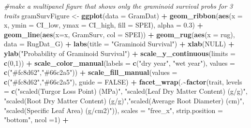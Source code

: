 \documentclass[
]{article}
\newenvironment{Shaded}{\begin{snugshade}}{\end{snugshade}}
\newcommand{\CommentTok}[1]{\textcolor[rgb]{0.56,0.35,0.01}{\textit{#1}}}
\newcommand{\DataTypeTok}[1]{\textcolor[rgb]{0.13,0.29,0.53}{#1}}
\newcommand{\DecValTok}[1]{\textcolor[rgb]{0.00,0.00,0.81}{#1}}
\newcommand{\FloatTok}[1]{\textcolor[rgb]{0.00,0.00,0.81}{#1}}
\newcommand{\KeywordTok}[1]{\textcolor[rgb]{0.13,0.29,0.53}{\textbf{#1}}}
\newcommand{\NormalTok}[1]{#1}
\newcommand{\OperatorTok}[1]{\textcolor[rgb]{0.81,0.36,0.00}{\textbf{#1}}}
\newcommand{\OtherTok}[1]{\textcolor[rgb]{0.56,0.35,0.01}{#1}}
\newcommand{\StringTok}[1]{\textcolor[rgb]{0.31,0.60,0.02}{#1}}
\begin{document}
\begin{Shaded}
\begin{Highlighting}[]
\CommentTok{\#make a multipanel figure that shows only the graminoid survival probs for 3 traits}
\NormalTok{gramSurvFigure \textless{}{-}}\StringTok{ }\KeywordTok{ggplot}\NormalTok{(}\DataTypeTok{data =}\NormalTok{ GramDat) }\OperatorTok{+}
\StringTok{  }\KeywordTok{geom\_ribbon}\NormalTok{(}\KeywordTok{aes}\NormalTok{(}\DataTypeTok{x =}\NormalTok{ x, }\DataTypeTok{ymin =}\NormalTok{ CI\_low, }\DataTypeTok{ymax =}\NormalTok{ CI\_high, }\DataTypeTok{fill =}\NormalTok{ SPEI), }\DataTypeTok{alpha =} \FloatTok{0.3}\NormalTok{) }\OperatorTok{+}
\StringTok{  }\KeywordTok{geom\_line}\NormalTok{(}\KeywordTok{aes}\NormalTok{(}\DataTypeTok{x=}\NormalTok{x, GramSurv, }\DataTypeTok{col =}\NormalTok{ SPEI))  }\OperatorTok{+}\StringTok{ }
\StringTok{  }\KeywordTok{geom\_rug}\NormalTok{(}\KeywordTok{aes}\NormalTok{(}\DataTypeTok{x =}\NormalTok{ rug), }\DataTypeTok{data =}\NormalTok{ RugDat\_G) }\OperatorTok{+}
\StringTok{  }\KeywordTok{labs}\NormalTok{(}\DataTypeTok{title =} \StringTok{"Graminoid Survival"}\NormalTok{) }\OperatorTok{+}
\StringTok{  }\KeywordTok{xlab}\NormalTok{(}\OtherTok{NULL}\NormalTok{) }\OperatorTok{+}
\StringTok{  }\KeywordTok{ylab}\NormalTok{(}\StringTok{"Probability of Graminoid Survival"}\NormalTok{) }\OperatorTok{+}
\StringTok{  }\KeywordTok{scale\_y\_continuous}\NormalTok{(}\DataTypeTok{limits =} \KeywordTok{c}\NormalTok{(}\DecValTok{0}\NormalTok{,}\DecValTok{1}\NormalTok{)) }\OperatorTok{+}
\StringTok{  }\KeywordTok{scale\_color\_manual}\NormalTok{(}\DataTypeTok{labels =} \KeywordTok{c}\NormalTok{(}\StringTok{"dry year"}\NormalTok{, }\StringTok{"wet year"}\NormalTok{), }\DataTypeTok{values =} \KeywordTok{c}\NormalTok{(}\StringTok{"\#fc8d62"}\NormalTok{,}\StringTok{"\#66c2a5"}\NormalTok{)) }\OperatorTok{+}
\StringTok{  }\KeywordTok{scale\_fill\_manual}\NormalTok{(}\DataTypeTok{values =} \KeywordTok{c}\NormalTok{(}\StringTok{"\#fc8d62"}\NormalTok{,}\StringTok{"\#66c2a5"}\NormalTok{), }\DataTypeTok{guide =} \OtherTok{FALSE}\NormalTok{) }\OperatorTok{+}
\StringTok{  }\KeywordTok{facet\_wrap}\NormalTok{(.}\OperatorTok{\textasciitilde{}}\KeywordTok{factor}\NormalTok{(trait, }\DataTypeTok{levels =} \KeywordTok{c}\NormalTok{(}\StringTok{"scaled(Turgor Loss Point) (MPa)"}\NormalTok{, }\StringTok{"scaled(Leaf Dry Matter Content) (g/g)"}\NormalTok{, }\StringTok{"scaled(Root Dry Matter Content) (g/g)"}\NormalTok{,}\StringTok{"scaled(Average Root Diameter) (cm)"}\NormalTok{, }\StringTok{"scaled(Specific Leaf Area) (g/cm2)"}\NormalTok{)), }\DataTypeTok{scales =} \StringTok{"free\_x"}\NormalTok{, }\DataTypeTok{strip.position =}  \StringTok{"bottom"}\NormalTok{, }\DataTypeTok{ncol =}\DecValTok{1}\NormalTok{) }\OperatorTok{+}

\end{Highlighting}
\end{Shaded}
\end{document}
